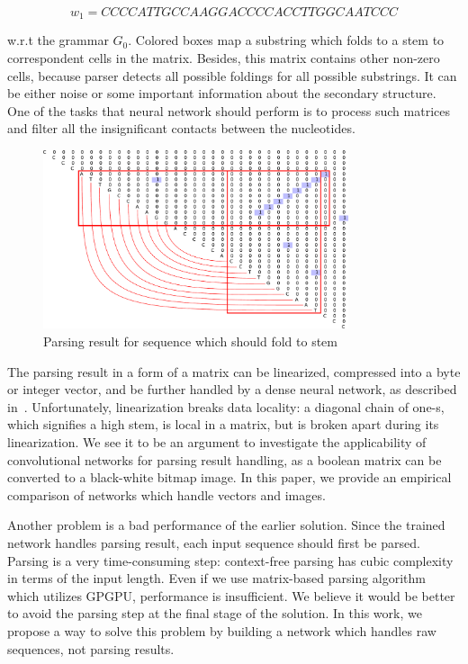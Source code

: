 \[
w_1 = CCCCATTGCCAAGGACCCCACCTTGGCAATCCC
\]

w.r.t the grammar $G_0$.
Colored boxes map a substring which folds to a stem to correspondent cells in the matrix. 
Besides, this matrix contains other non-zero cells, because parser detects all possible foldings for all possible substrings. 
It can be either noise or some important information about the secondary structure. 
One of the tasks that neural network should perform is to process such matrices and filter all the insignificant contacts between the nucleotides.

\begin{figure}[h]
\begin{center}
\centering
\includegraphics[width=0.8\textwidth]{figures/4.pdf}
\caption{Parsing result for sequence which should fold to
stem}
\label{fig:example}
\end{center}
\end{figure}

The parsing result in a form of a matrix can be linearized, compressed into a byte or integer vector, and be further handled by a dense neural network, as described in~\cite{grigorevcomposition}.
Unfortunately, linearization breaks data locality: a diagonal chain of one-s, which signifies a high stem, is local in a matrix, but is broken apart during its linearization.
We see it to be an argument to investigate the applicability of convolutional networks for parsing result handling, as a boolean matrix can be converted to a black-white bitmap image.
In this paper, we provide an empirical comparison of networks which handle vectors and images.

Another problem is a bad performance of the earlier solution.
Since the trained network handles parsing result, each input sequence should first be parsed.
Parsing is a very time-consuming step: context-free parsing has cubic complexity in terms of the input length.
Even if we use matrix-based parsing algorithm~\cite{Azimov:2018:CPQ:3210259.3210264} which utilizes GPGPU, performance is insufficient.
We believe it would be better to avoid the parsing step at the final stage of the solution.
In this work, we propose a way to solve this problem by building a network which handles raw sequences, not parsing results.
